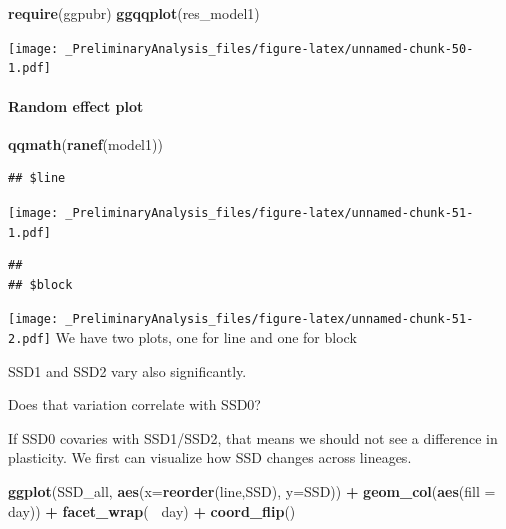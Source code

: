 \documentclass[
]{article}
\newenvironment{Shaded}{\begin{snugshade}}{\end{snugshade}}
\newcommand{\DataTypeTok}[1]{\textcolor[rgb]{0.13,0.29,0.53}{#1}}
\newcommand{\KeywordTok}[1]{\textcolor[rgb]{0.13,0.29,0.53}{\textbf{#1}}}
\newcommand{\NormalTok}[1]{#1}
\newcommand{\OperatorTok}[1]{\textcolor[rgb]{0.81,0.36,0.00}{\textbf{#1}}}
\newcommand{\StringTok}[1]{\textcolor[rgb]{0.31,0.60,0.02}{#1}}
\begin{document}
\begin{Shaded}
\begin{Highlighting}[]
\KeywordTok{require}\NormalTok{(ggpubr)}
\KeywordTok{ggqqplot}\NormalTok{(res_model1)}
\end{Highlighting}
\end{Shaded}

\texttt{[image: \_PreliminaryAnalysis\_files/figure-latex/unnamed-chunk-50-1.pdf]}

\hypertarget{random-effect-plot-2}{%
\paragraph{Random effect plot}\label{random-effect-plot-2}}

\begin{Shaded}
\begin{Highlighting}[]
\KeywordTok{qqmath}\NormalTok{(}\KeywordTok{ranef}\NormalTok{(model1))}
\end{Highlighting}
\end{Shaded}

\begin{verbatim}
## $line
\end{verbatim}

\texttt{[image: \_PreliminaryAnalysis\_files/figure-latex/unnamed-chunk-51-1.pdf]}

\begin{verbatim}
## 
## $block
\end{verbatim}

\texttt{[image: \_PreliminaryAnalysis\_files/figure-latex/unnamed-chunk-51-2.pdf]}
We have two plots, one for line and one for block

SSD1 and SSD2 vary also significantly.

Does that variation correlate with SSD0?

If SSD0 covaries with SSD1/SSD2, that means we should not see a
difference in plasticity. We first can visualize how SSD changes across
lineages.

\begin{Shaded}
\begin{Highlighting}[]
\KeywordTok{ggplot}\NormalTok{(SSD_all, }\KeywordTok{aes}\NormalTok{(}\DataTypeTok{x=}\KeywordTok{reorder}\NormalTok{(line,SSD), }\DataTypeTok{y=}\NormalTok{SSD)) }\OperatorTok{+}
\StringTok{  }\KeywordTok{geom_col}\NormalTok{(}\KeywordTok{aes}\NormalTok{(}\DataTypeTok{fill =}\NormalTok{ day)) }\OperatorTok{+}
\StringTok{  }\KeywordTok{facet_wrap}\NormalTok{(}\OperatorTok{~}\StringTok{ }\NormalTok{day) }\OperatorTok{+}
\StringTok{  }\KeywordTok{coord_flip}\NormalTok{()}
\end{Highlighting}
\end{Shaded}
\end{document}
